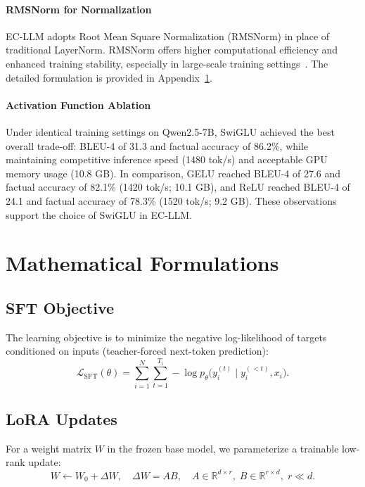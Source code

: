 \documentclass[]{interact}
\theoremstyle{plain}%
\theoremstyle{definition}
\theoremstyle{remark}
\begin{document}
\paragraph{RMSNorm for Normalization} EC-LLM adopts Root Mean Square Normalization (RMSNorm) in place of traditional LayerNorm. RMSNorm offers higher computational efficiency and enhanced training stability, especially in large-scale training settings~\cite{zhang2019root}. The detailed formulation is provided in Appendix~\ref{secA2}.

\paragraph{Activation Function Ablation} Under identical training settings on Qwen2.5-7B, SwiGLU achieved the best overall trade-off: BLEU-4 of 31.3 and factual accuracy of 86.2\%, while maintaining competitive inference speed (1480 tok/s) and acceptable GPU memory usage (10.8 GB). In comparison, GELU reached BLEU-4 of 27.6 and factual accuracy of 82.1\% (1420 tok/s; 10.1 GB), and ReLU reached BLEU-4 of 24.1 and factual accuracy of 78.3\% (1520 tok/s; 9.2 GB). These observations support the choice of SwiGLU in EC-LLM.

\section{Mathematical Formulations}\label{secA2}

\subsection{SFT Objective}
The learning objective is to minimize the negative log-likelihood of targets conditioned on inputs (teacher-forced next-token prediction):
\begin{equation}
\label{eq:sft}
\mathcal{L}_{\mathrm{SFT}}(\theta) 
= \sum_{i=1}^{N} \sum_{t=1}^{T_i} -\log p_{\theta}\big(y_i^{(t)} \mid y_i^{(<t)}, x_i\big).
\end{equation}

\subsection{LoRA Updates}
For a weight matrix \(W\) in the frozen base model, we parameterize a trainable low-rank update:
\begin{equation}
W \leftarrow W_0 + \Delta W,\quad \Delta W = A B,\quad A \in \mathbb{R}^{d\times r},\; B \in \mathbb{R}^{r\times d},\; r\ll d.
\end{equation}
\end{document}
